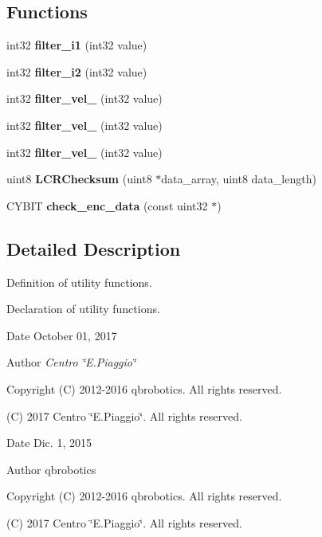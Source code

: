 \subsection*{Functions}
\begin{DoxyCompactItemize}
\item 
\mbox{\label{utils_8h_a3588bc1aa14c6ea245387dda7eb7ffbe}} 
int32 {\bfseries filter\+\_\+i1} (int32 value)
\item 
\mbox{\label{utils_8h_ac9c746215432427ee4e8d7dbb84b1c1a}} 
int32 {\bfseries filter\+\_\+i2} (int32 value)
\item 
\mbox{\label{utils_8h_ad378840ee71c2d41d2d4f1a84465c7f3}} 
int32 {\bfseries filter\+\_\+vel\+\_} (int32 value)
\item 
\mbox{\label{utils_8h_abda54d76e676bb1cb27b5577bd0fe099}} 
int32 {\bfseries filter\+\_\+vel\+\_} (int32 value)
\item 
\mbox{\label{utils_8h_a70430ee90ed28e4c9fca0c4ca3d6583e}} 
int32 {\bfseries filter\+\_\+vel\+\_} (int32 value)
\item 
\mbox{\label{utils_8h_a6205a6e88f72f4cc321a7d8abca23e26}} 
uint8 {\bfseries L\+C\+R\+Checksum} (uint8 $\ast$data\+\_\+array, uint8 data\+\_\+length)
\item 
\mbox{\label{utils_8h_a8f6aff189d5fbbb0be1fdd13e0e720c0}} 
C\+Y\+B\+IT {\bfseries check\+\_\+enc\+\_\+data} (const uint32 $\ast$)
\end{DoxyCompactItemize}


\subsection{Detailed Description}
Definition of utility functions. 

Declaration of utility functions.

\begin{DoxyDate}{Date}
October 01, 2017 
\end{DoxyDate}
\begin{DoxyAuthor}{Author}
{\itshape Centro \char`\"{}\+E.\+Piaggio\char`\"{}} 
\end{DoxyAuthor}
\begin{DoxyCopyright}{Copyright}
(C) 2012-\/2016 qbrobotics. All rights reserved. 

(C) 2017 Centro \char`\"{}\+E.\+Piaggio\char`\"{}. All rights reserved.
\end{DoxyCopyright}
\begin{DoxyDate}{Date}
Dic. 1, 2015 
\end{DoxyDate}
\begin{DoxyAuthor}{Author}
qbrobotics 
\end{DoxyAuthor}
\begin{DoxyCopyright}{Copyright}
(C) 2012-\/2016 qbrobotics. All rights reserved. 

(C) 2017 Centro \char`\"{}\+E.\+Piaggio\char`\"{}. All rights reserved. 
\end{DoxyCopyright}
